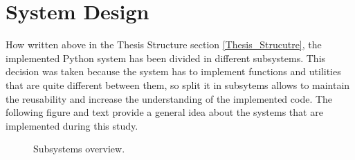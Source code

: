 





\section{System Design}
\label{System_Design}

How written above in the Thesis Structure section \ref{Thesis_Strucutre}, the implemented Python system has been divided in different subsystems. This decision was taken because the system has to implement functions and utilities that are quite different between them, so split it in subsytems allows to maintain the reusability and increase the understanding of the implemented code.
The following figure and text provide a general idea about the systems that are implemented during this study.

\begin{figure}[h]
    \caption[Subsystems overview]{Subsystems overview.}
    \label{fig: Subsystems_Overview}
\end{figure}

